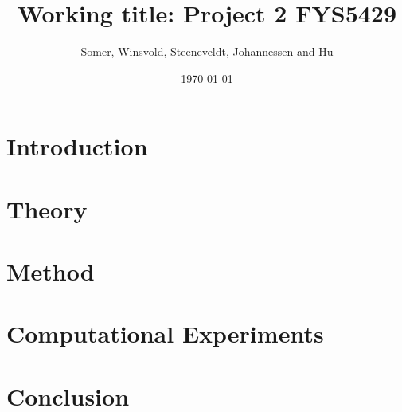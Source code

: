 \documentclass[aps,rmp,reprint,amsmath,amssymb,longbibliography,twocolumn,floatfix]{revtex4-1}
\begin{document}
\title{Working title: Project 2 FYS5429}

\author{Somer, Winsvold, Steeneveldt, Johannessen and Hu}
\date{\today}


\begin{abstract}

\end{abstract}

\maketitle

\tableofcontents

\section{Introduction}
\label{sec:introduction}

\section{Theory}
\label{sec:theory}

\section{Method}\label{sec:method}

\section{Computational Experiments}


\section{Conclusion}
\label{sec:conclusion}

\newpage

\appendix

\end{document}
